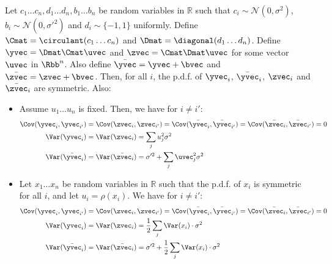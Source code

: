 \begin{lemma}
Let $c_{1} \ldots c_{n}, d_{1} \ldots d_{n}, b_{1} \ldots b_{n}$ be random variables in $\mathbb{R}$ such that $c_{i}\sim\mathcal{N}(0,\sigma^{2})$, $b_{i}\sim\mathcal{N}(0,\sigma'^{2})$ and $d_{i}\sim\{-1,1\}$ uniformly.
Define $\Cmat = \circulant(c_{1} \ldots c_{n})$ and $\Dmat = \diagonal (d_{1} \ldots d_{n})$.
Define $\yvec = \Dmat \Cmat \uvec$ and $\zvec = \Cmat \Dmat \uvec$ for some vector $\uvec$ in $\Rbb^{n}$.
Also define $\bar{\yvec} = \yvec + \bvec$ and $\bar{\zvec} = \zvec + \bvec$.
Then, for all $i$, the p.d.f. of $\yvec_{i}$, $\bar{\yvec}_{i}$, $\zvec_{i}$ and $\bar{\zvec}_{i}$ are symmetric.
Also:
\begin{itemize}
  \item Assume $u_1 \ldots u_n$ is fixed. Then, we have for $i \neq i'$:
  \begin{align*}
    \Cov(\yvec_i, \yvec_{i'}) & = \Cov(\zvec_i, \zvec_{i'}) = \Cov(\bar{\yvec}_i, \bar{\yvec}_{i'}) = \Cov(\bar{\zvec}_i,\bar{\zvec}_{i'}) = 0 \\
    \Var(\yvec_i) &= \Var(\zvec_{i}) = \sum_{j} u_{j}^{2}\sigma^{2} \\
    \Var(\bar{\yvec}_{i}) & = \Var(\bar{\zvec}_{i}) = \sigma'^2 + \sum_{j} \uvec_{j}^{2} \sigma^{2}
  \end{align*}
  \item Let $x_{1}\ldots x_{n}$ be random variables in $\mathbb{R}$ such that the p.d.f. of $x_{i}$ is symmetric for all $i$, and let $u_{i} = \rho(x_{i})$.
    We have for $i\neq i':$
  \begin{align*}
    \Cov(\yvec_i, \yvec_{i'}) & = \Cov(\zvec_{i}, \zvec_{i'}) = \Cov(\bar{\yvec}_{i}, \bar{\yvec}_{i'}) = \Cov(\bar{\zvec}_i, \bar{\zvec}_{i'})= 0 \\ 
    \Var(\yvec_i) & = \Var(\zvec_i) = \frac{1}{2} \sum_j \Var(x_i) \cdot \sigma^2 \\
    \Var(\bar{\yvec}_{i}) &= \Var(\bar{\zvec}_{i}) = \sigma'^2 + \frac{1}{2} \sum_{j} \Var(x_{i}) \cdot \sigma^2
  \end{align*}
\end{itemize}
\label{lemma:covariance}
\end{lemma}


